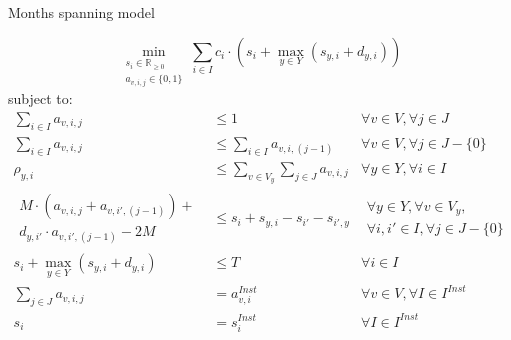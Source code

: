\documentclass{beamer}
\begin{document}

\begin{frame}{Months spanning model}
\scriptsize

\begin{equation}
	\min_{\substack{s_i \in \mathbb{R}_{\geq 0} \\ 
	a_{v,i,j} \in \{0, 1\}}} 
	\sum_{i \in I} c_i \cdot (s_i + \max_{y \in Y} (s_{y,i}+ d_{y,i}))
\end{equation}
subject to:
\begin{align}
\sum_{i \in I} a_{v,i,j}						&\leq 		1							& \forall v \in V, \forall j \in J 						\\
\sum_{i \in I} a_{v,i,j}						&\leq 		\sum_{i \in I} a_{v,i,(j-1)}				& \forall v \in V, \forall j \in J - \{ 0 \}					\\
\rho_{y,i}								&\leq	 	\sum_{v \in V_y} \sum_{j \in J} a_{v,i,j} 	& \forall y \in Y, \forall i \in I						\\	
\begin{aligned} M \cdot (a_{v,i,j} + a_{v,i',(j-1)}) + \\ 
d_{y,i'} \cdot a_{v,i',(j-1)} - 2M \end{aligned}			&\leq	 	s_i + s_{y,i} - s_{i'} - s_{i',y}			& \begin{aligned} \forall y \in Y, \forall v \in V_y, 			\\
																		\forall i, i' \in I, \forall j \in J - \{ 0 \}	\end{aligned}		\\
s_i + \max_{y \in Y} (s_{y,i}+ d_{y,i})				&\leq		T 							&\forall i \in I 								\\
\sum_{j \in J} a_{v,i,j}						&=		a^{Inst}_{v,i}					& \forall v \in V, \forall I \in I^{Inst}  					\\
s_i									&=		s^{Inst}_i 						& \forall I \in I^{Inst}  					
\end{align}

\end{frame}
\end{document}
